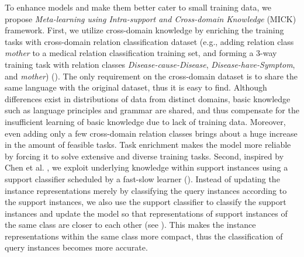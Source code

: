 To %
enhance models and make them better cater to small training data, we propose
\emph{Meta-learning using Intra-support and Cross-domain Knowledge} (MICK) framework.
First, we
utilize cross-domain knowledge by enriching the training tasks with cross-domain relation classification dataset
(e.g., adding relation class \emph{mother} to a medical relation classification training set,
and forming a 3-way training task with relation classes \emph{Disease-cause-Disease}, \emph{Disease-have-Symptom}, and \emph{mother})
().
The only requirement on the cross-domain dataset is to share the same language with the original dataset, thus it is easy to find.
Although differences exist in distributions of data from distinct domains, basic knowledge such as language principles and grammar are shared, and thus compensate for the insufficient learning of basic knowledge due to lack of training data.
Moreover,
even adding only a few cross-domain relation classes brings about a huge increase in the amount of feasible tasks. Task enrichment makes the model more reliable by forcing it to solve extensive and diverse training tasks.
Second, inspired by Chen et al. , we exploit underlying knowledge within support instances using a support classifier scheduled by a fast-slow learner ().
Instead of updating the instance representations merely by classifying the query instances according to the support instances, 
we also use the support classifier to classify the support instances and update the model so that representations of support instances of the same class are closer to each other (see ). 
This makes the instance representations within the same class more compact, thus the classification of query instances becomes more accurate.

